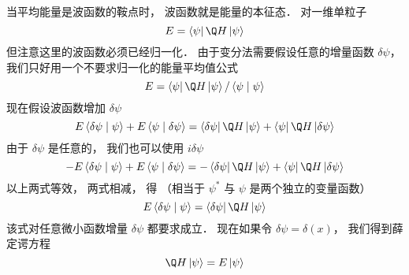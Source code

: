 
当平均能量是波函数的鞍点时， 波函数就是能量的本征态． 对一维单粒子
 \begin{equation}
E = \left\langle \psi  \right|\Q H\left| \psi  \right\rangle 
\end{equation}
但注意这里的波函数必须已经归一化． 由于变分法需要假设任意的增量函数 $\delta \psi $，  我们只好用一个不要求归一化的能量平均值公式
 \begin{equation}
E = \left\langle \psi  \right|\Q H\left| \psi  \right\rangle /\left\langle {\psi }
 \mathrel{\left | {\vphantom {\psi  \psi }}
 \right. \kern-\nulldelimiterspace}
 {\psi } \right\rangle 
\end{equation}
现在假设波函数增加 $\delta \psi $ 
 \begin{equation}
E\left\langle {{\delta \psi }}
 \mathrel{\left | {\vphantom {{\delta \psi } \psi }}
 \right. \kern-\nulldelimiterspace}
 {\psi } \right\rangle  + E\left\langle {\psi }
 \mathrel{\left | {\vphantom {\psi  {\delta \psi }}}
 \right. \kern-\nulldelimiterspace}
 {{\delta \psi }} \right\rangle  = \left\langle {\delta \psi } \right|\Q H\left| \psi  \right\rangle  + \left\langle \psi  \right|\Q H\left| {\delta \psi } \right\rangle 
\end{equation}
由于 $\delta \psi $ 是任意的， 我们也可以使用 $i\delta \psi $ 
 \begin{equation}
 - E\left\langle {{\delta \psi }}
 \mathrel{\left | {\vphantom {{\delta \psi } \psi }}
 \right. \kern-\nulldelimiterspace}
 {\psi } \right\rangle  + E\left\langle {\psi }
 \mathrel{\left | {\vphantom {\psi  {\delta \psi }}}
 \right. \kern-\nulldelimiterspace}
 {{\delta \psi }} \right\rangle  =  - \left\langle {\delta \psi } \right|\Q H\left| \psi  \right\rangle  + \left\langle \psi  \right|\Q H\left| {\delta \psi } \right\rangle 
\end{equation}
以上两式等效， 两式相减， 得 （相当于 ${\psi ^ * }$ 与 $\psi $ 是两个独立的变量函数）
 \begin{equation}
E\left\langle {{\delta \psi }}
 \mathrel{\left | {\vphantom {{\delta \psi } \psi }}
 \right. \kern-\nulldelimiterspace}
 {\psi } \right\rangle  = \left\langle {\delta \psi } \right|\Q H\left| \psi  \right\rangle 
\end{equation}
该式对任意微小函数增量 $\delta \psi $ 都要求成立． 现在如果令 $\delta \psi  = \delta (x)$，  我们得到薛定谔方程
 \begin{equation}
\Q H\left| \psi  \right\rangle  = E\left| \psi  \right\rangle 
\end{equation}
